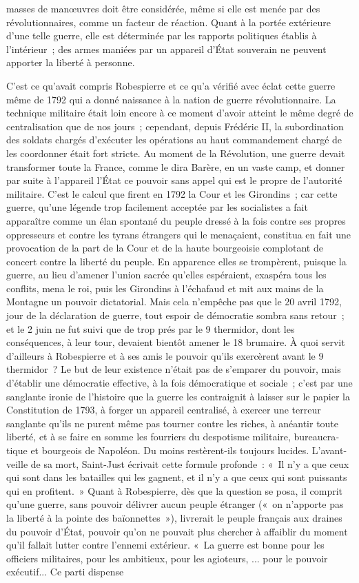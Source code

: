 \documentclass[french,twoside]{book} %
\begin{document}
masses de manœuvres doit être considérée, même si elle est menée par des révolutionnaires, comme un facteur de réaction. Quant à la portée extérieure d'une telle guerre, elle est déterminée par les rapports politi­ques établis à l'intérieur ; des armes maniées par un appareil d'État souverain ne peuvent apporter la liberté à personne.\par
C'est ce qu'avait compris Robespierre et ce qu'a vérifié avec éclat cette guerre même de 1792 qui a donné naissance à la nation de guerre révolu­tionnaire. La technique militaire était loin encore à ce moment d'avoir atteint le même degré de centralisation que de nos jours ; cependant, depuis Frédéric II, la subordination des soldats chargés d'exécuter les opérations au haut commandement chargé de les coordonner était fort stricte. Au moment de la Révolution, une guerre devait transformer toute la France, comme le dira Barère, en un vaste camp, et donner par suite à l'appareil l'État ce pouvoir sans appel qui est le propre de l'autorité militaire. C'est le calcul que firent en 1792 la Cour et les Girondins ; car cette guerre, qu'une légende trop facilement acceptée par les socialistes a fait apparaître comme un élan spontané du peuple dressé à la fois contre ses propres oppresseurs et contre les tyrans étrangers qui le menaçaient, constitua en fait une provocation de la part de la Cour et de la haute bourgeoisie complotant de concert contre la liberté du peuple. En apparence elles se trompèrent, puisque la guerre, au lieu d'amener l'union sacrée qu'elles espéraient, exaspéra tous les conflits, mena le roi, puis les Girondins à l'échafaud et mit aux mains de la Montagne un pouvoir dictatorial. Mais cela n'empêche pas que le 20 avril 1792, jour de la décla­ration de guerre, tout espoir de démocratie sombra sans retour ; et le 2 juin ne fut suivi que de trop prés par le 9 thermidor, dont les conséquences, à leur tour, devaient bientôt amener le 18 brumaire. À quoi servit d'ailleurs à Robes­pierre et à ses amis le pouvoir qu'ils exercèrent avant le 9 thermidor ? Le but de leur existence n'était pas de s'emparer du pouvoir, mais d'établir une démocratie effective, à la fois démocratique et sociale ; c'est par une sanglante ironie de l'histoire que la guerre les contraignit à laisser sur le papier la Constitution de 1793, à forger un appareil centralisé, à exercer une terreur sanglante qu'ils ne purent même pas tourner contre les riches, à anéantir toute liberté, et à se faire en somme les fourriers du despotisme militaire, bureaucra­tique et bourgeois de Napoléon. Du moins restèrent-ils toujours lucides. L'avant-veille de sa mort, Saint-Just écrivait cette formule profonde : « Il n'y a que ceux qui sont dans les batailles qui les gagnent, et il n'y a que ceux qui sont puissants qui en profitent. » Quant à Robespierre, dès que la question se posa, il comprit qu'une guerre, sans pouvoir délivrer aucun peuple étranger (« on n'apporte pas la liberté à la pointe des baïonnettes »), livrerait le peuple français aux draines du pouvoir d'État, pouvoir qu'on ne pouvait plus chercher à affaiblir du moment qu'il fallait lutter contre l'ennemi extérieur. « La guerre est bonne pour les officiers militaires, pour les ambitieux, pour les agioteurs, ... pour le pouvoir exécutif... Ce parti dispense 
\end{document}
